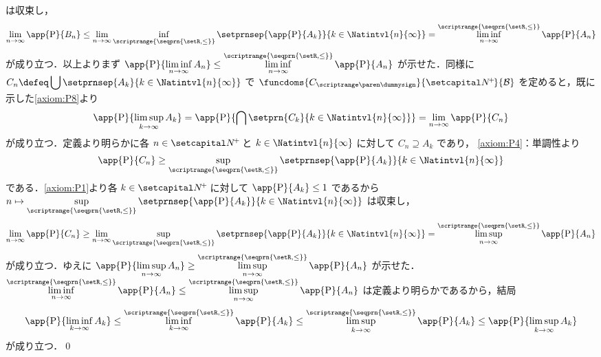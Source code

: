 \documentclass[a4paper,dvipdfmx,leqno]{jsarticle}
\begin{document}
{{        は収束し，
        \begin{align*}
          \lim_{n \to \infty} \app{\Prob}{B_{n}}
            \leq \lim_{n \to \infty} \inf_{\scriptrange{\seqprn{\setR, \leq}}} \setprnsep{\app{\Prob}{A_{k}}}{k \in \Natintvl{n}{\infty}}
              = \liminf_{n \to \infty}^{\scriptrange{\seqprn{\setR, \leq}}} \app{\Prob}{A_{n}}
        \end{align*}
        が成り立つ\QUESTION ．以上よりまず
        \(\displaystyle \app{\Prob}{\liminf_{n \to \infty} A_{n}}
          \leq \liminf_{n \to \infty}^{\scriptrange{\seqprn{\setR, \leq}}} \app{\Prob}{A_{n}}\)
        が示せた．同様に \(\displaystyle C_{n} \defeq \bigcup \setprnsep{A_{k}}{k \in \Natintvl{n}{\infty}}\) で
        \(\funcdoms{C_{\dummysub}}{\setNpos}{\famB}\) を定めると，既に示した\eqref{axiom:P8}より
        \begin{align*}
          \app{\Prob}{\limsup_{k \to \infty} A_{k}}
            = \app{\Prob}{\bigcap \setprn{C_{k}}{k \in \Natintvl{n}{\infty}}}
              = \lim_{n \to \infty} \app{\Prob}{C_{n}}
        \end{align*}
        が成り立つ．定義より明らかに各 \(n \in \setNpos\) と \(k \in \Natintvl{n}{\infty}\) に対して \(C_{n} \supseteq A_{k}\) であり，
        \eqref{axiom:P4}：単調性より
        \begin{align*}
          \app{\Prob}{C_{n}} \geq \sup_{\scriptrange{\seqprn{\setR, \leq}}} \setprnsep{\app{\Prob}{A_{k}}}{k \in \Natintvl{n}{\infty}}
        \end{align*}
        である．\eqref{axiom:P1}より各 \(k \in \setNpos\) に対して \(\app{\Prob}{A_{k}} \leq 1\) であるから
        \(\displaystyle n \mapsto \sup_{\scriptrange{\seqprn{\setR, \leq}}} \setprnsep{\app{\Prob}{A_{k}}}{k \in \Natintvl{n}{\infty}}\)
        は収束し，
        \begin{align*}
          \lim_{n \to \infty} \app{\Prob}{C_{n}}
            \geq \lim_{n \to \infty} \sup_{\scriptrange{\seqprn{\setR, \leq}}} \setprnsep{\app{\Prob}{A_{k}}}{k \in \Natintvl{n}{\infty}}
              = \limsup_{n \to \infty}^{\scriptrange{\seqprn{\setR, \leq}}} \app{\Prob}{A_{n}}
        \end{align*}
        が成り立つ\QUESTION ．ゆえに
        \(\displaystyle \app{\Prob}{\limsup_{n \to \infty} A_{n}}
          \geq \limsup_{n \to \infty}^{\scriptrange{\seqprn{\setR, \leq}}} \app{\Prob}{A_{n}}\)
        が示せた．
        \(\displaystyle \liminf_{n \to \infty}^{\scriptrange{\seqprn{\setR, \leq}}} \app{\Prob}{A_{n}} \leq
          \limsup_{n \to \infty}^{\scriptrange{\seqprn{\setR, \leq}}} \app{\Prob}{A_{n}}\)
        は定義より明らかであるから，結局
        \begin{align*}
          \app{\Prob}{\liminf_{k \to \infty} A_{k}}
            \leq \liminf_{k \to \infty}^{\scriptrange{\seqprn{\setR, \leq}}} \app{\Prob}{A_{k}}
              \leq \limsup_{k \to \infty}^{\scriptrange{\seqprn{\setR, \leq}}} \app{\Prob}{A_{k}}
                \leq \app{\Prob}{\limsup_{k \to \infty} A_{k}}
        \end{align*}
        が成り立つ．\qed
      }
    }
\end{document}
